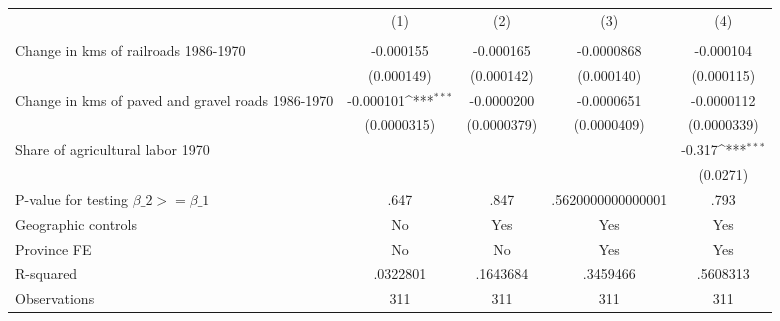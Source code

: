 {
\def\sym#1{\ifmmode^{#1}\else\(^{#1}\)\fi}
\begin{tabular}{l*{4}{c}}
\hline\hline
                &\multicolumn{1}{c}{(1)}&\multicolumn{1}{c}{(2)}&\multicolumn{1}{c}{(3)}&\multicolumn{1}{c}{(4)}\\
                &\multicolumn{1}{c}{}&\multicolumn{1}{c}{}&\multicolumn{1}{c}{}&\multicolumn{1}{c}{}\\
\hline
Change in kms of railroads 1986-1970&-0.000155         &-0.000165         &-0.0000868         &-0.000104         \\
                &(0.000149)         &(0.000142)         &(0.000140)         &(0.000115)         \\
[1em]
Change in kms of paved and gravel roads 1986-1970&-0.000101\sym{***}&-0.0000200         &-0.0000651         &-0.0000112         \\
                &(0.0000315)         &(0.0000379)         &(0.0000409)         &(0.0000339)         \\
[1em]
Share of agricultural labor 1970&                  &                  &                  &   -0.317\sym{***}\\
                &                  &                  &                  & (0.0271)         \\
\hline
P-value for testing $\beta\_{2} >= \beta\_{1}$&     .647         &     .847         &.5620000000000001         &     .793         \\
Geographic controls&       No         &      Yes         &      Yes         &      Yes         \\
Province FE     &       No         &       No         &      Yes         &      Yes         \\
R-squared       & .0322801         & .1643684         & .3459466         & .5608313         \\
Observations    &      311         &      311         &      311         &      311         \\
\hline\hline
\end{tabular}
}
